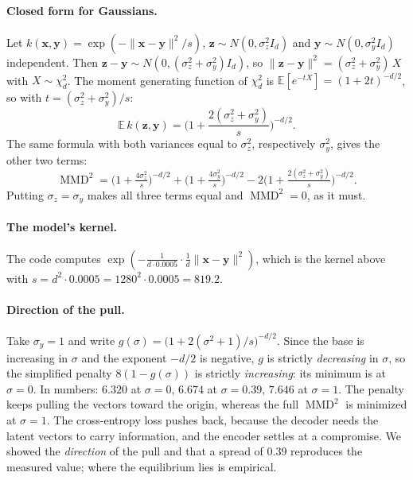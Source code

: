 \documentclass[11pt]{article}
\newcommand{\E}{\mathbb{E}}
\DeclareMathOperator{\MMD}{MMD}
\begin{document}
\paragraph{Closed form for Gaussians.} Let $k(\bm x,\bm y)=\exp(-\lVert\bm x-\bm y\rVert^2/s)$, $\bm z\sim N(0,\sigma_z^2I_d)$ and $\bm y\sim N(0,\sigma_y^2I_d)$ independent. Then $\bm z-\bm y\sim N(0,(\sigma_z^2+\sigma_y^2)I_d)$, so $\lVert\bm z-\bm y\rVert^2=(\sigma_z^2+\sigma_y^2)\,X$ with $X\sim\chi^2_d$. The moment generating function of $\chi^2_d$ is $\E[e^{-tX}]=(1+2t)^{-d/2}$, so with $t=(\sigma_z^2+\sigma_y^2)/s$:
\begin{equation}
  \E\,k(\bm z,\bm y)=\Big(1+\frac{2(\sigma_z^2+\sigma_y^2)}{s}\Big)^{-d/2}.
\end{equation}
The same formula with both variances equal to $\sigma_z^2$, respectively $\sigma_y^2$, gives the other two terms:
\[
  \MMD^2=\Big(1+\tfrac{4\sigma_z^2}{s}\Big)^{-d/2}+\Big(1+\tfrac{4\sigma_y^2}{s}\Big)^{-d/2}-2\Big(1+\tfrac{2(\sigma_z^2+\sigma_y^2)}{s}\Big)^{-d/2}.
\]
Putting $\sigma_z=\sigma_y$ makes all three terms equal and $\MMD^2=0$, as it must.

\paragraph{The model's kernel.} The code computes $\exp(-\tfrac{1}{d\cdot0.0005}\cdot\tfrac1d\lVert\bm x-\bm y\rVert^2)$, which is the kernel above with $s=d^2\cdot0.0005=1280^2\cdot0.0005=819.2$.

\paragraph{Direction of the pull.} Take $\sigma_y=1$ and write $g(\sigma)=\big(1+2(\sigma^2+1)/s\big)^{-d/2}$. Since the base is increasing in $\sigma$ and the exponent $-d/2$ is negative, $g$ is strictly \emph{decreasing} in $\sigma$, so the simplified penalty $8(1-g(\sigma))$ is strictly \emph{increasing}: its minimum is at $\sigma=0$. In numbers: $6.320$ at $\sigma=0$, $6.674$ at $\sigma=0.39$, $7.646$ at $\sigma=1$. The penalty keeps pulling the vectors toward the origin, whereas the full $\MMD^2$ is minimized at $\sigma=1$. The cross-entropy loss pushes back, because the decoder needs the latent vectors to carry information, and the encoder settles at a compromise. We showed the \emph{direction} of the pull and that a spread of $0.39$ reproduces the measured value; where the equilibrium lies is empirical.

\label{sec:S5}
\end{document}
